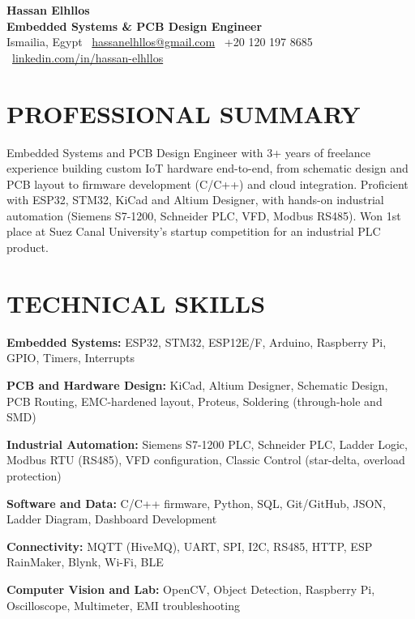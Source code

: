 \documentclass[10pt,a4paper]{article}
\begin{document}
\begin{center}
  {\fontsize{22}{26}\selectfont\bfseries Hassan Elhllos}\\[2pt]
  {\fontsize{11.5}{14}\selectfont\bfseries\color{accent}Embedded Systems \& PCB Design Engineer}\\[2pt]
  {\color{muted}\small Ismailia, Egypt \textbar\ \href{mailto:hassanelhllos@gmail.com}{hassanelhllos@gmail.com} \textbar\ +20 120 197 8685 \textbar\ \href{https://www.linkedin.com/in/hassan-elhllos-664188255/}{linkedin.com/in/hassan-elhllos}}
\end{center}
\vspace{1pt}
{\color{divider}{\rule{\linewidth}{1.4pt}}}\vspace{3pt}

\section*{PROFESSIONAL SUMMARY}
Embedded Systems and PCB Design Engineer with 3+ years of freelance experience building custom IoT hardware end-to-end, from schematic design and PCB layout to firmware development (C/C++) and cloud integration. Proficient with ESP32, STM32, KiCad and Altium Designer, with hands-on industrial automation (Siemens S7-1200, Schneider PLC, VFD, Modbus RS485). Won 1st place at Suez Canal University's startup competition for an industrial PLC product.

\section*{TECHNICAL SKILLS}
\textbf{Embedded Systems:} ESP32, STM32, ESP12E/F, Arduino, Raspberry Pi, GPIO, Timers, Interrupts\par
\textbf{PCB and Hardware Design:} KiCad, Altium Designer, Schematic Design, PCB Routing, EMC-hardened layout, Proteus, Soldering (through-hole and SMD)\par
\textbf{Industrial Automation:} Siemens S7-1200 PLC, Schneider PLC, Ladder Logic, Modbus RTU (RS485), VFD configuration, Classic Control (star-delta, overload protection)\par
\textbf{Software and Data:} C/C++ firmware, Python, SQL, Git/GitHub, JSON, Ladder Diagram, Dashboard Development\par
\textbf{Connectivity:} MQTT (HiveMQ), UART, SPI, I2C, RS485, HTTP, ESP RainMaker, Blynk, Wi-Fi, BLE\par
\textbf{Computer Vision and Lab:} OpenCV, Object Detection, Raspberry Pi, Oscilloscope, Multimeter, EMI troubleshooting
\end{document}

